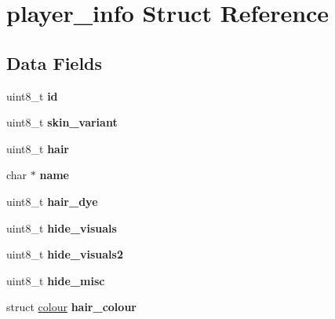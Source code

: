 \hypertarget{structplayer__info}{}\section{player\+\_\+info Struct Reference}
\label{structplayer__info}
\subsection*{Data Fields}
\begin{DoxyCompactItemize}
\item 
\hypertarget{structplayer__info_a4ef327c463ad1baecdf1c8c617e23530}{}uint8\+\_\+t {\bfseries id}\label{structplayer__info_a4ef327c463ad1baecdf1c8c617e23530}

\item 
\hypertarget{structplayer__info_acdfe61c07e0b498337c6b1592043e194}{}uint8\+\_\+t {\bfseries skin\+\_\+variant}\label{structplayer__info_acdfe61c07e0b498337c6b1592043e194}

\item 
\hypertarget{structplayer__info_a18550d5b5be4a483967a6fc50cc3c963}{}uint8\+\_\+t {\bfseries hair}\label{structplayer__info_a18550d5b5be4a483967a6fc50cc3c963}

\item 
\hypertarget{structplayer__info_a786de92265035af86c7fd50c15df61b6}{}char $\ast$ {\bfseries name}\label{structplayer__info_a786de92265035af86c7fd50c15df61b6}

\item 
\hypertarget{structplayer__info_a6221b245efad9621d89eccaeefc14dfe}{}uint8\+\_\+t {\bfseries hair\+\_\+dye}\label{structplayer__info_a6221b245efad9621d89eccaeefc14dfe}

\item 
\hypertarget{structplayer__info_a038005834c654a5e6c6bea5b2fd43df5}{}uint8\+\_\+t {\bfseries hide\+\_\+visuals}\label{structplayer__info_a038005834c654a5e6c6bea5b2fd43df5}

\item 
\hypertarget{structplayer__info_a92a7b80b5f6242ae7bcbf4472c23d851}{}uint8\+\_\+t {\bfseries hide\+\_\+visuals2}\label{structplayer__info_a92a7b80b5f6242ae7bcbf4472c23d851}

\item 
\hypertarget{structplayer__info_afa9a5e3b37ba96b10add14f7d2def667}{}uint8\+\_\+t {\bfseries hide\+\_\+misc}\label{structplayer__info_afa9a5e3b37ba96b10add14f7d2def667}

\item 
\hypertarget{structplayer__info_a5a663ec0bf0f0d1dd02fbe34e59f326f}{}struct \hyperlink{structcolour}{colour} {\bfseries hair\+\_\+colour}\label{structplayer__info_a5a663ec0bf0f0d1dd02fbe34e59f326f}


\end{DoxyCompactItemize}
